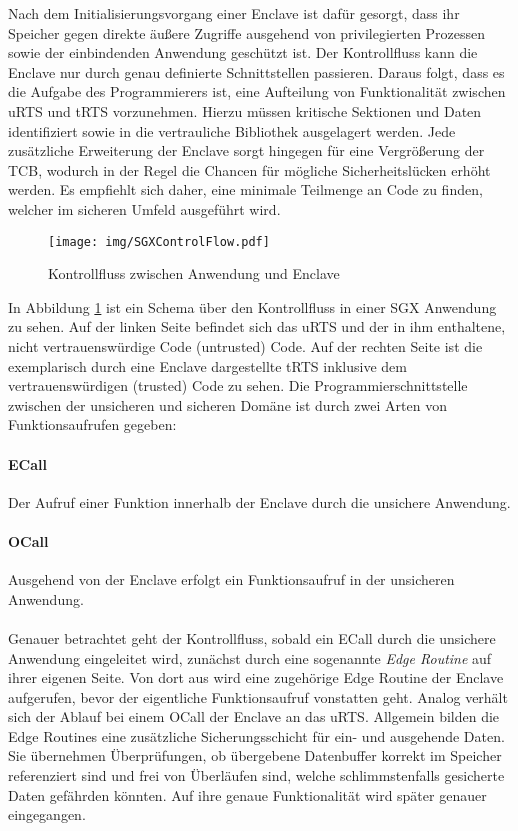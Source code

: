 Nach dem Initialisierungsvorgang einer Enclave ist dafür gesorgt, dass ihr Speicher gegen direkte äußere Zugriffe ausgehend von privilegierten Prozessen sowie der einbindenden Anwendung geschützt ist. Der Kontrollfluss kann die Enclave nur durch genau definierte Schnittstellen passieren. Daraus folgt, dass es die Aufgabe des Programmierers ist, eine Aufteilung von Funktionalität zwischen \ac{uRTS} und \ac{tRTS} vorzunehmen. Hierzu müssen kritische Sektionen und Daten identifiziert sowie in die vertrauliche Bibliothek ausgelagert werden. Jede zusätzliche Erweiterung der Enclave sorgt hingegen für eine Vergrößerung der \ac{TCB}, wodurch in der Regel die Chancen für mögliche Sicherheitslücken erhöht werden. Es empfiehlt sich daher, eine minimale Teilmenge an Code zu finden, welcher im sicheren Umfeld ausgeführt wird.

\begin{figure}
	\texttt{[image: img/SGXControlFlow.pdf]}
	\centering
	\caption{Kontrollfluss zwischen Anwendung und Enclave}
	\label{fig:sgxcontrolflow}
\end{figure}

In Abbildung \ref{fig:sgxcontrolflow} ist ein Schema über den Kontrollfluss in einer SGX Anwendung zu sehen. Auf der linken Seite befindet sich das uRTS und der in ihm enthaltene, nicht vertrauenswürdige Code (untrusted) Code. Auf der rechten Seite ist die exemplarisch durch eine Enclave dargestellte tRTS inklusive dem vertrauenswürdigen (trusted) Code zu sehen. Die Programmierschnittstelle zwischen der unsicheren und sicheren Domäne ist durch zwei Arten von Funktionsaufrufen gegeben:

\paragraph{\ac{ECall}} Der Aufruf einer Funktion innerhalb der Enclave durch die unsichere Anwendung.

\paragraph{\ac{OCall}} Ausgehend von der Enclave erfolgt ein Funktionsaufruf in der unsicheren Anwendung.

\paragraph{} 
Genauer betrachtet geht der Kontrollfluss, sobald ein \ac{ECall} durch die unsichere Anwendung eingeleitet wird, zunächst durch eine sogenannte \textit{Edge Routine} auf ihrer eigenen Seite. Von dort aus wird eine zugehörige Edge Routine der Enclave aufgerufen, bevor der eigentliche Funktionsaufruf vonstatten geht. Analog verhält sich der Ablauf bei einem \ac{OCall} der Enclave an das \ac{uRTS}. Allgemein bilden die Edge Routines eine zusätzliche Sicherungsschicht für ein- und ausgehende Daten. Sie übernehmen Überprüfungen, ob übergebene Datenbuffer korrekt im Speicher referenziert sind und frei von Überläufen sind, welche schlimmstenfalls gesicherte Daten gefährden könnten. Auf ihre genaue Funktionalität wird später genauer eingegangen.

